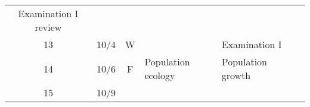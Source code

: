 \documentclass[]{article}
\begin{document}
\begin{longtable}[]{@{}ccclll@{}}
\begin{minipage}[t]{0.12\columnwidth}
Examination I review\strut
\end{minipage} & \begin{minipage}[t]{0.12\columnwidth}\raggedright\strut
\strut
\end{minipage}\tabularnewline
\begin{minipage}[t]{0.13\columnwidth}\centering\strut
13\strut
\end{minipage} & \begin{minipage}[t]{0.08\columnwidth}\centering\strut
10/4\strut
\end{minipage} & \begin{minipage}[t]{0.07\columnwidth}\centering\strut
W\strut
\end{minipage} & \begin{minipage}[t]{0.10\columnwidth}\raggedright\strut
\strut
\end{minipage} & \begin{minipage}[t]{0.12\columnwidth}\raggedright\strut
Examination I\strut
\end{minipage} & \begin{minipage}[t]{0.12\columnwidth}\raggedright\strut
\strut
\end{minipage}\tabularnewline
\begin{minipage}[t]{0.13\columnwidth}\centering\strut
14\strut
\end{minipage} & \begin{minipage}[t]{0.08\columnwidth}\centering\strut
10/6\strut
\end{minipage} & \begin{minipage}[t]{0.07\columnwidth}\centering\strut
F\strut
\end{minipage} & \begin{minipage}[t]{0.10\columnwidth}\raggedright\strut
Population ecology\strut
\end{minipage} & \begin{minipage}[t]{0.12\columnwidth}\raggedright\strut
Population growth\strut
\end{minipage} & \begin{minipage}[t]{0.12\columnwidth}\raggedright\strut
\strut
\end{minipage}\tabularnewline
\begin{minipage}[t]{0.13\columnwidth}\centering\strut
15\strut
\end{minipage} & \begin{minipage}[t]{0.08\columnwidth}\centering\strut
10/9\strut
\end{minipage} & \begin{minipage}[t]{0.07\columnwidth}\centering\strut

\end{minipage}
\end{longtable}
\end{document}

